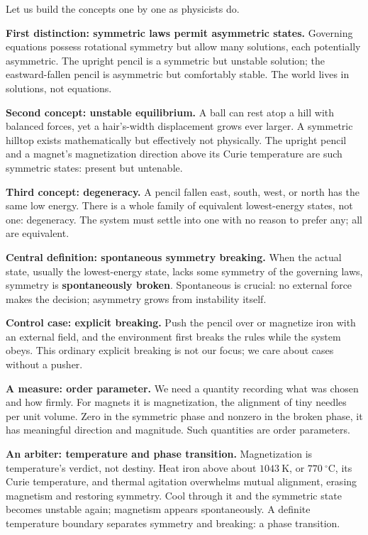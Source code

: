 \begin{mainline}
Let us build the concepts one by one as physicists do.

\textbf{First distinction: symmetric laws permit asymmetric states.} Governing equations possess rotational symmetry but allow many solutions, each potentially asymmetric. The upright pencil is a symmetric but unstable solution; the eastward-fallen pencil is asymmetric but comfortably stable. The world lives in solutions, not equations.

\textbf{Second concept: unstable equilibrium.} A ball can rest atop a hill with balanced forces, yet a hair's-width displacement grows ever larger. A symmetric hilltop exists mathematically but effectively not physically. The upright pencil and a magnet's magnetization direction above its Curie temperature are such symmetric states: present but untenable.

\textbf{Third concept: degeneracy.} A pencil fallen east, south, west, or north has the same low energy. There is a whole family of equivalent lowest-energy states, not one: degeneracy. The system must settle into one with no reason to prefer any; all are equivalent.

\textbf{Central definition: spontaneous symmetry breaking.} When the actual state, usually the lowest-energy state, lacks some symmetry of the governing laws, symmetry is \textbf{spontaneously broken}. Spontaneous is crucial: no external force makes the decision; asymmetry grows from instability itself.

\textbf{Control case: explicit breaking.} Push the pencil over or magnetize iron with an external field, and the environment first breaks the rules while the system obeys. This ordinary explicit breaking is not our focus; we care about cases without a pusher.

\textbf{A measure: order parameter.} We need a quantity recording what was chosen and how firmly. For magnets it is magnetization, the alignment of tiny needles per unit volume. Zero in the symmetric phase and nonzero in the broken phase, it has meaningful direction and magnitude. Such quantities are order parameters.

\textbf{An arbiter: temperature and phase transition.} Magnetization is temperature's verdict, not destiny. Heat iron above about \(1043\ \mathrm{K}\), or \(770\ ^{\circ}\mathrm{C}\), its Curie temperature, and thermal agitation overwhelms mutual alignment, erasing magnetism and restoring symmetry. Cool through it and the symmetric state becomes unstable again; magnetism appears spontaneously. A definite temperature boundary separates symmetry and breaking: a phase transition.


\end{mainline}
